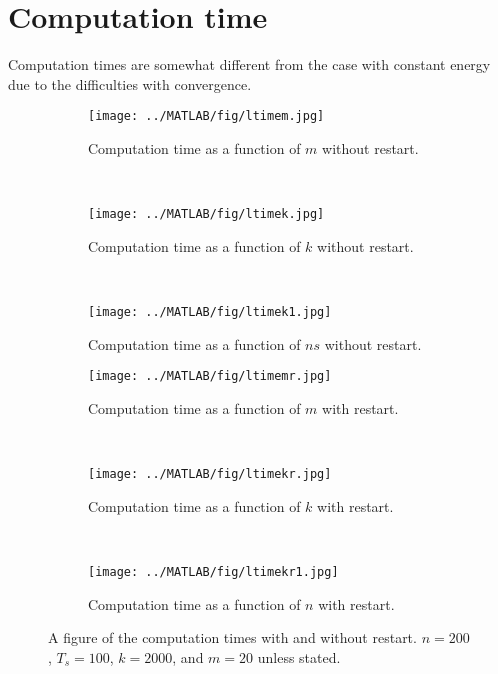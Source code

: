 \section{Computation time} %
\label{sec:vruntime}
Computation times are somewhat different from the case with constant energy due to the difficulties with convergence. 
\begin{figure}[H]
        \centering
        \begin{subfigure}[b]{0.3\textwidth}
                \texttt{[image: ../MATLAB/fig/ltimem.jpg]}
                \caption{ Computation time as a function of $m$ without restart. }
                \label{fig:ltimem}
        \end{subfigure}
        ~
        \begin{subfigure}[b]{0.3\textwidth}
                \texttt{[image: ../MATLAB/fig/ltimek.jpg]}
                \caption{ Computation time as a function of $k$ without restart. }
                \label{fig:ltimek}
        \end{subfigure}
        ~
        \begin{subfigure}[b]{0.3\textwidth}
                \texttt{[image: ../MATLAB/fig/ltimek1.jpg]}
                \caption{ Computation time as a function of $ns$ without restart. }
                \label{fig:ltimek1}
        \end{subfigure}
        
                \begin{subfigure}[b]{0.3\textwidth}
                \texttt{[image: ../MATLAB/fig/ltimemr.jpg]}
                \caption{ Computation time as a function of $m$ with restart. }
                \label{fig:ltimemr}
        \end{subfigure}
        ~
        \begin{subfigure}[b]{0.3\textwidth}
                \texttt{[image: ../MATLAB/fig/ltimekr.jpg]}
                \caption{ Computation time as a function of $k$ with restart. }
                \label{fig:ltimekr}
        \end{subfigure}
        ~
        \begin{subfigure}[b]{0.3\textwidth}
                \texttt{[image: ../MATLAB/fig/ltimekr1.jpg]}
                \caption{ Computation time as a function of $n$ with restart. }
                \label{fig:ltimekr1}
        \end{subfigure}
        \caption{ A figure of the computation times with and without restart. $n = 200$, $T_s = 100$, $k = 2000$, and $m = 20$ unless stated. }
        \label{fig:ltime0}
\end{figure}
